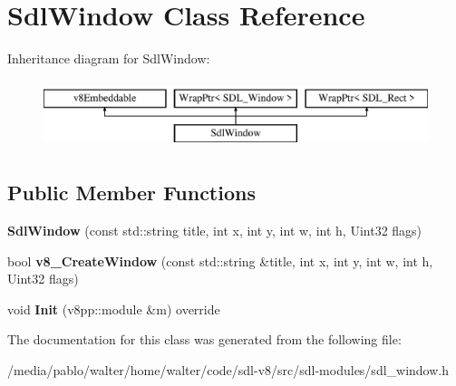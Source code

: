 \hypertarget{classSdlWindow}{}\section{Sdl\+Window Class Reference}
\label{classSdlWindow}
Inheritance diagram for Sdl\+Window\+:\begin{figure}[H]
\begin{center}
\leavevmode
\includegraphics[height=2.000000cm]{classSdlWindow}
\end{center}
\end{figure}
\subsection*{Public Member Functions}
\begin{DoxyCompactItemize}
\item 
\mbox{\label{classSdlWindow_aefb5b3a983d7daded3514d80775f2b48}} 
{\bfseries Sdl\+Window} (const std\+::string title, int x, int y, int w, int h, Uint32 flags)
\item 
\mbox{\label{classSdlWindow_aec7d1421e4f251c898f8782c39200fe2}} 
bool {\bfseries v8\+\_\+\+Create\+Window} (const std\+::string \&title, int x, int y, int w, int h, Uint32 flags)
\item 
\mbox{\label{classSdlWindow_a4d3b2b527ade8e588996355202317dbb}} 
void {\bfseries Init} (v8pp\+::module \&m) override
\end{DoxyCompactItemize}


The documentation for this class was generated from the following file\+:\begin{DoxyCompactItemize}
\item 
/media/pablo/walter/home/walter/code/sdl-\/v8/src/sdl-\/modules/sdl\+\_\+window.\+h\end{DoxyCompactItemize}
